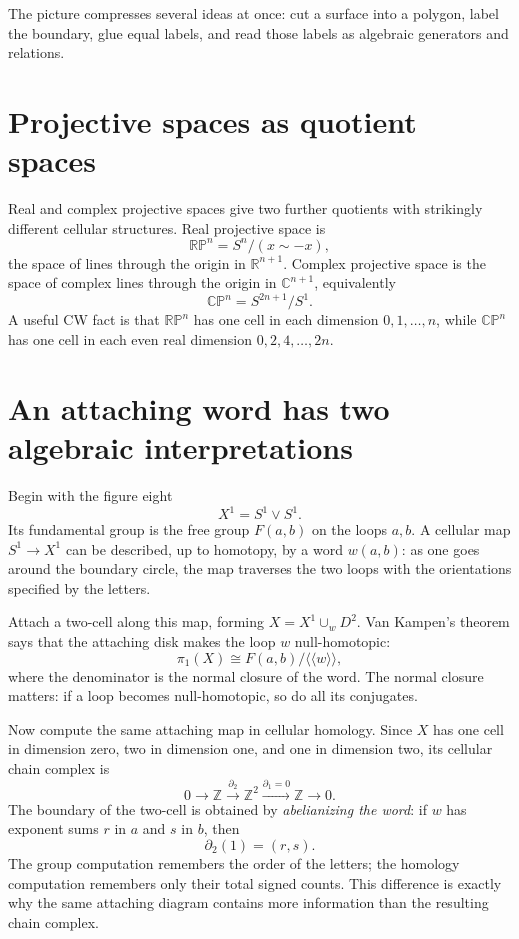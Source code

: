 The picture compresses several ideas at once: cut a surface into a polygon, label the boundary, glue equal labels, and read those labels as algebraic generators and relations.

\section{Projective spaces as quotient spaces}

Real and complex projective spaces give two further quotients with strikingly different cellular structures.  Real projective space is
\[
  \mathbb{RP}^n=S^n/(x\sim -x),
\]
the space of lines through the origin in $\mathbb R^{n+1}$.  Complex projective space is the space of complex lines through the origin in $\mathbb C^{n+1}$, equivalently
\[
  \mathbb{CP}^n=S^{2n+1}/S^1.
\]
A useful CW fact is that $\mathbb{RP}^n$ has one cell in each dimension $0,1,\ldots,n$, while $\mathbb{CP}^n$ has one cell in each even real dimension $0,2,4,\ldots,2n$.


\section{An attaching word has two algebraic interpretations}

Begin with the figure eight
\[
 X^1=S^1\vee S^1.
\]
Its fundamental group is the free group \(F(a,b)\) on the loops \(a,b\). A cellular map \(S^1\to X^1\) can be described, up to homotopy, by a word \(w(a,b)\): as one goes around the boundary circle, the map traverses the two loops with the orientations specified by the letters.

Attach a two-cell along this map, forming \(X=X^1\cup_wD^2\). Van Kampen's theorem says that the attaching disk makes the loop \(w\) null-homotopic:
\[
 \boxed{\pi_1(X)\cong
  F(a,b)/\langle\!\langle w\rangle\!\rangle,}
\]
where the denominator is the normal closure of the word. The normal closure matters: if a loop becomes null-homotopic, so do all its conjugates.

Now compute the same attaching map in cellular homology. Since \(X\) has one cell in dimension zero, two in dimension one, and one in dimension two, its cellular chain complex is
\[
 0\longrightarrow\mathbb Z
 \xrightarrow{\partial_2}\mathbb Z^2
 \xrightarrow{\partial_1=0}\mathbb Z
 \longrightarrow0.
\]
The boundary of the two-cell is obtained by \emph{abelianizing the word}: if \(w\) has exponent sums \(r\) in \(a\) and \(s\) in \(b\), then
\[
 \boxed{\partial_2(1)=(r,s).}
\]
The group computation remembers the order of the letters; the homology computation remembers only their total signed counts. This difference is exactly why the same attaching diagram contains more information than the resulting chain complex.


